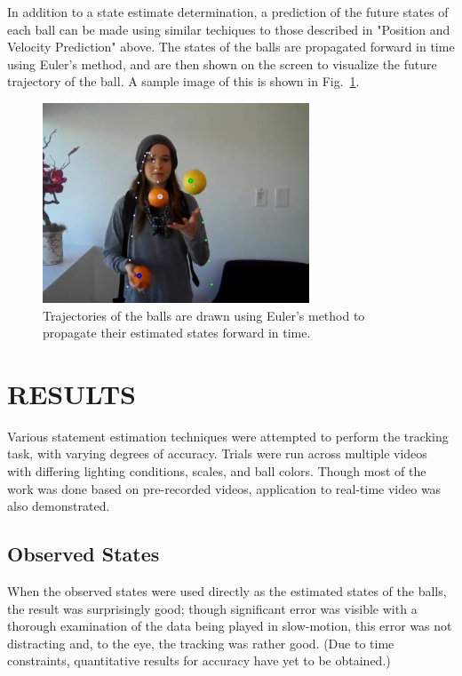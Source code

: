 \documentclass[letterpaper, 10 pt, conference]{ieeeconf}  %
\begin{document}
In addition to a state estimate determination, a prediction of the future states of each ball can be made using similar techiques to those described in "Position and Velocity Prediction" above. The states of the balls are propagated forward in time using Euler's method, and are then shown on the screen to visualize the future trajectory of the ball. A sample image of this is shown in Fig.~\ref{fig:trajectories}.

\begin{figure}
\centering
    \includegraphics{trajectories.png}
    \caption{Trajectories of the balls are drawn using Euler's method to propagate their estimated states forward in time.}
    \label{fig:trajectories}
\end{figure}

\section{RESULTS}

Various statement estimation techniques were attempted to perform the tracking task, with varying degrees of accuracy. Trials were run across multiple videos with differing lighting conditions, scales, and ball colors. Though most of the work was done based on pre-recorded videos, application to real-time video was also demonstrated.

\subsection{Observed States}

When the observed states were used directly as the estimated states of the balls, the result was surprisingly good; though significant error was visible with a thorough examination of the data being played in slow-motion, this error was not distracting and, to the eye, the tracking was rather good. (Due to time constraints, quantitative results for accuracy have yet to be obtained.)
\end{document}
